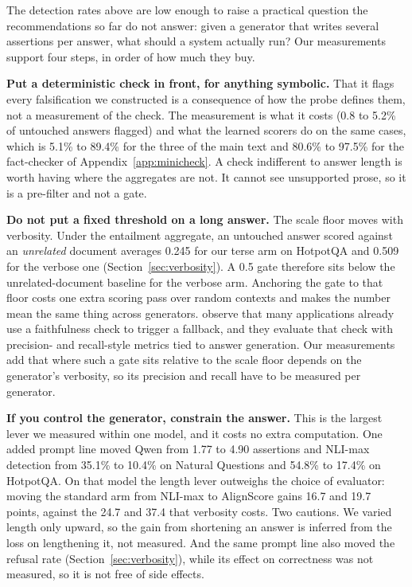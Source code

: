 \label{sec:deploy}

The detection rates above are low enough to raise a practical question the recommendations so far do not answer: given a generator that writes several assertions per answer, what should a system actually run? Our measurements support four steps, in order of how much they buy.

\textbf{Put a deterministic check in front, for anything symbolic.} That it flags every falsification we constructed is a consequence of how the probe defines them, not a measurement of the check. The measurement is what it costs (0.8 to 5.2\% of untouched answers flagged) and what the learned scorers do on the same cases, which is 5.1\% to 89.4\% for the three of the main text and 80.6\% to 97.5\% for the fact-checker of Appendix~\ref{app:minicheck}. A check indifferent to answer length is worth having where the aggregates are not. It cannot see unsupported prose, so it is a pre-filter and not a gate.

\textbf{Do not put a fixed threshold on a long answer.} The scale floor moves with verbosity. Under the entailment aggregate, an untouched answer scored against an \emph{unrelated} document averages 0.245 for our terse arm on HotpotQA and 0.509 for the verbose one (Section~\ref{sec:verbosity}). A 0.5 gate therefore sits below the unrelated-document baseline for the verbose arm. Anchoring the gate to that floor costs one extra scoring pass over random contexts and makes the number mean the same thing across generators. \citet{filice-etal-2025-generate} observe that many applications already use a faithfulness check to trigger a fallback, and they evaluate that check with precision- and recall-style metrics tied to answer generation. Our measurements add that where such a gate sits relative to the scale floor depends on the generator's verbosity, so its precision and recall have to be measured per generator.

\textbf{If you control the generator, constrain the answer.} This is the largest lever we measured within one model, and it costs no extra computation. One added prompt line moved Qwen from 1.77 to 4.90 assertions and NLI-max detection from 35.1\% to 10.4\% on Natural Questions and 54.8\% to 17.4\% on HotpotQA. On that model the length lever outweighs the choice of evaluator: moving the standard arm from NLI-max to AlignScore gains 16.7 and 19.7 points, against the 24.7 and 37.4 that verbosity costs. Two cautions. We varied length only upward, so the gain from shortening an answer is inferred from the loss on lengthening it, not measured. And the same prompt line also moved the refusal rate (Section~\ref{sec:verbosity}), while its effect on correctness was not measured, so it is not free of side effects.

